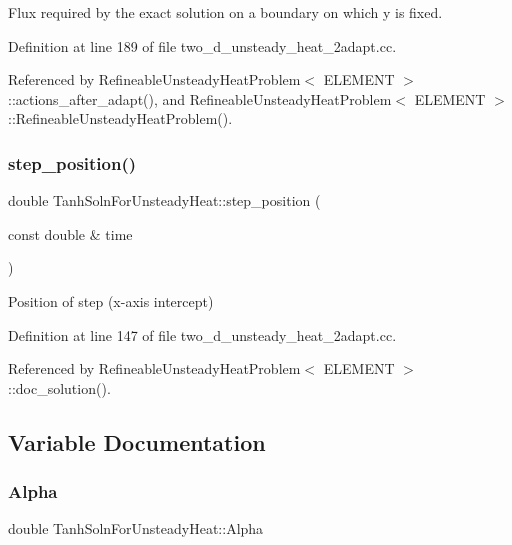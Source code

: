 Flux required by the exact solution on a boundary on which y is fixed. 



Definition at line 189 of file two\+\_\+d\+\_\+unsteady\+\_\+heat\+\_\+2adapt.\+cc.



Referenced by Refineable\+Unsteady\+Heat\+Problem$<$ E\+L\+E\+M\+E\+N\+T $>$\+::actions\+\_\+after\+\_\+adapt(), and Refineable\+Unsteady\+Heat\+Problem$<$ E\+L\+E\+M\+E\+N\+T $>$\+::\+Refineable\+Unsteady\+Heat\+Problem().

\mbox{\label{namespaceTanhSolnForUnsteadyHeat_a99f50e575e38e80aa305ead2d4497272}} 
\subsubsection{\texorpdfstring{step\+\_\+position()}{step\_position()}}
{\footnotesize\ttfamily double Tanh\+Soln\+For\+Unsteady\+Heat\+::step\+\_\+position (\begin{DoxyParamCaption}\item[{const double \&}]{time }\end{DoxyParamCaption})}



Position of step (x-\/axis intercept) 



Definition at line 147 of file two\+\_\+d\+\_\+unsteady\+\_\+heat\+\_\+2adapt.\+cc.



Referenced by Refineable\+Unsteady\+Heat\+Problem$<$ E\+L\+E\+M\+E\+N\+T $>$\+::doc\+\_\+solution().



\subsection{Variable Documentation}
\mbox{\label{namespaceTanhSolnForUnsteadyHeat_a4c75d9887d6f25405bbead696a94db63}} 
\subsubsection{\texorpdfstring{Alpha}{Alpha}}
{\footnotesize\ttfamily double Tanh\+Soln\+For\+Unsteady\+Heat\+::\+Alpha}



